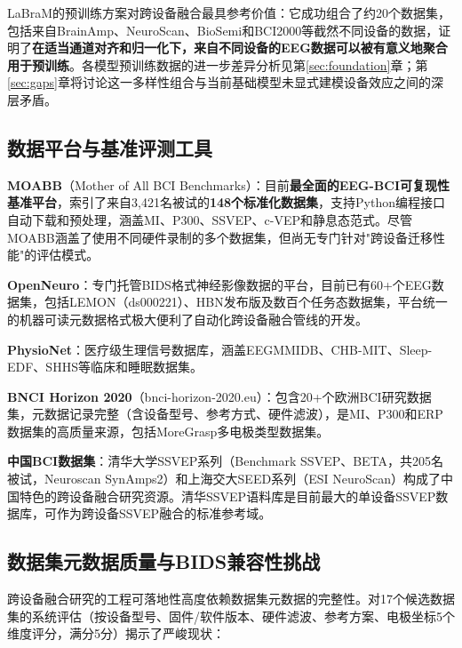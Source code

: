 \documentclass[12pt, a4paper]{article}
\begin{document}
LaBraM的预训练方案\citep{Jiang2024LaBraM}对跨设备融合最具参考价值：它成功组合了约20个数据集，包括来自BrainAmp、NeuroScan、BioSemi和BCI2000等截然不同设备的数据，证明了\textbf{在适当通道对齐和归一化下，来自不同设备的EEG数据可以被有意义地聚合用于预训练}。各模型预训练数据的进一步差异分析见第\ref{sec:foundation}章；第\ref{sec:gaps}章将讨论这一多样性组合与当前基础模型未显式建模设备效应之间的深层矛盾。

\subsection{数据平台与基准评测工具}

\textbf{MOABB}（Mother of All BCI Benchmarks）\citep{Chevallier2024MOABB}：目前\textbf{最全面的EEG-BCI可复现性基准平台}，索引了来自3,421名被试的\textbf{148个标准化数据集}，支持Python编程接口自动下载和预处理，涵盖MI、P300、SSVEP、c-VEP和静息态范式。尽管MOABB涵盖了使用不同硬件录制的多个数据集，但尚无专门针对"跨设备迁移性能"的评估模式。

\textbf{OpenNeuro}\citep{Markiewicz2021OpenNeuro}：专门托管BIDS格式神经影像数据的平台，目前已有60+个EEG数据集，包括LEMON（ds000221）、HBN发布版及数百个任务态数据集，平台统一的机器可读元数据格式极大便利了自动化跨设备融合管线的开发。

\textbf{PhysioNet}：医疗级生理信号数据库\citep{PhysioNetMotor}，涵盖EEGMMIDB、CHB-MIT、Sleep-EDF、SHHS\citep{SHHS2000}等临床和睡眠数据集。

\textbf{BNCI Horizon 2020}（bnci-horizon-2020.eu）：包含20+个欧洲BCI研究数据集，元数据记录完整（含设备型号、参考方式、硬件滤波），是MI、P300和ERP数据集的高质量来源，包括MoreGrasp多电极类型数据集\citep{Schwarz2020MoreGrasp}。

\textbf{中国BCI数据集}：清华大学SSVEP系列（Benchmark SSVEP\citep{WangBenchmarkSSVEP2016}、BETA\citep{BETA2020}，共205名被试，Neuroscan SynAmps2）和上海交大SEED系列\citep{Zheng2015SEED}（ESI NeuroScan）构成了中国特色的跨设备融合研究资源。清华SSVEP语料库是目前最大的单设备SSVEP数据库，可作为跨设备SSVEP融合的标准参考域。

\subsection{数据集元数据质量与BIDS兼容性挑战}

跨设备融合研究的工程可落地性高度依赖数据集元数据的完整性。对17个候选数据集的系统评估（按设备型号、固件/软件版本、硬件滤波、参考方案、电极坐标5个维度评分，满分5分）揭示了严峻现状：
\end{document}
